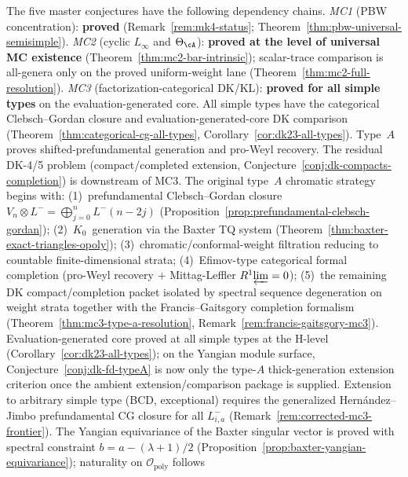 \begin{remark}\label{rem:master-conjecture-dependency-chains}
The five master conjectures have the following dependency chains.
\emph{MC1} (PBW concentration): \textbf{proved}
(Remark~\ref{rem:mk4-status};
Theorem~\ref{thm:pbw-universal-semisimple}).
\emph{MC2} (cyclic $L_\infty$ and $\Theta_{\cA}$): \textbf{proved at
the level of universal MC existence}
(Theorem~\ref{thm:mc2-bar-intrinsic}); scalar-trace
comparison is all-genera only on the proved
uniform-weight lane (Theorem~\ref{thm:mc2-full-resolution}).
\emph{MC3} (factorization-categorical DK/KL):
\textbf{proved for all simple types} on the evaluation-generated core.
All simple types have the categorical Clebsch--Gordan closure and
evaluation-generated-core DK comparison
\textup{(}Theorem~\ref{thm:categorical-cg-all-types},
Corollary~\ref{cor:dk23-all-types}\textup{)}.
Type~$A$ proves shifted-prefundamental generation and
pro-Weyl recovery. The residual DK-4/5 problem (compact/completed
extension, Conjecture~\ref{conj:dk-compacts-completion}) is
downstream of MC3. The original type~$A$ chromatic strategy begins with:
(1)~prefundamental Clebsch--Gordan closure
$V_n \otimes L^- = \bigoplus_{j=0}^{n} L^-(n-2j)$
(Proposition~\ref{prop:prefundamental-clebsch-gordan});
(2)~$K_0$~generation via the Baxter TQ system
(Theorem~\ref{thm:baxter-exact-triangles-opoly});
(3)~chromatic/conformal-weight filtration reducing to countable
finite-dimensional strata;
(4)~Efimov-type categorical formal completion (pro-Weyl recovery
$+$ Mittag-Leffler $R^1\!\varprojlim = 0$);
(5)~the remaining DK compact/completion packet isolated by spectral
sequence degeneration on weight strata together with the
Francis--Gaitsgory completion formalism
\textup{(}Theorem~\ref{thm:mc3-type-a-resolution},
Remark~\ref{rem:francis-gaitsgory-mc3}\textup{)}.
Evaluation-generated core proved at all simple types at the H-level
\textup{(}Corollary~\ref{cor:dk23-all-types}\textup{)}; on the
Yangian module surface, Conjecture~\ref{conj:dk-fd-typeA} is now only the
type-$A$ thick-generation extension criterion once the ambient
extension/comparison package is supplied. Extension to arbitrary simple
type (BCD, exceptional) requires the generalized Hern\'andez--Jimbo
prefundamental CG closure for all $L^-_{i,a}$
(Remark~\ref{rem:corrected-mc3-frontier}).
The Yangian equivariance of the Baxter singular vector is proved
with spectral constraint $b = a - (\lambda+1)/2$
(Proposition~\ref{prop:baxter-yangian-equivariance}); naturality
on $\mathcal{O}_{\mathrm{poly}}$ follows

\end{remark}
